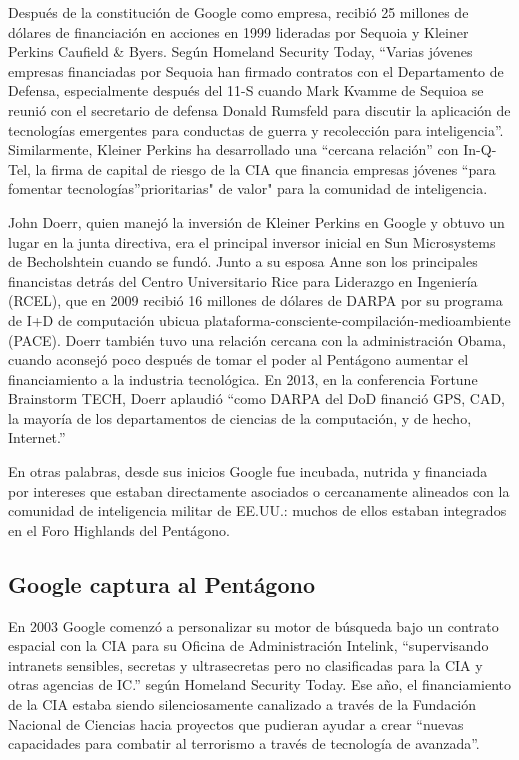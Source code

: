 \documentclass[10pt,a5paper,twoside,spanish,]{book}
\begin{document}
Después de la constitución de Google como empresa, recibió 25 millones
de dólares de financiación en acciones en 1999 lideradas por Sequoia y
Kleiner Perkins Caufield \& Byers. Según Homeland Security Today,
``Varias jóvenes empresas financiadas por Sequoia han firmado contratos
con el Departamento de Defensa, especialmente después del 11-S cuando
Mark Kvamme de Sequioa se reunió con el secretario de defensa Donald
Rumsfeld para discutir la aplicación de tecnologías emergentes para
conductas de guerra y recolección para inteligencia''. Similarmente,
Kleiner Perkins ha desarrollado una ``cercana relación'' con In-Q-Tel,
la firma de capital de riesgo de la CIA que financia empresas jóvenes
``para fomentar tecnologías''prioritarias" de valor" para la comunidad
de inteligencia.

John Doerr, quien manejó la inversión de Kleiner Perkins en Google y
obtuvo un lugar en la junta directiva, era el principal inversor inicial
en Sun Microsystems de Becholshtein cuando se fundó. Junto a su esposa
Anne son los principales financistas detrás del Centro Universitario
Rice para Liderazgo en Ingeniería (RCEL), que en 2009 recibió 16
millones de dólares de DARPA por su programa de I+D de computación
ubicua plataforma-consciente-compilación-medioambiente (PACE). Doerr
también tuvo una relación cercana con la administración Obama, cuando
aconsejó poco después de tomar el poder al Pentágono aumentar el
financiamiento a la industria tecnológica. En 2013, en la conferencia
Fortune Brainstorm TECH, Doerr aplaudió ``como DARPA del DoD financió
GPS, CAD, la mayoría de los departamentos de ciencias de la computación,
y de hecho, Internet.''

En otras palabras, desde sus inicios Google fue incubada, nutrida y
financiada por intereses que estaban directamente asociados o
cercanamente alineados con la comunidad de inteligencia militar de
EE.UU.: muchos de ellos estaban integrados en el Foro Highlands del
Pentágono.

\subsection{Google captura al
Pentágono}\label{google-captura-al-pentuxe1gono}

En 2003 Google comenzó a personalizar su motor de búsqueda bajo un
contrato espacial con la CIA para su Oficina de Administración Intelink,
``supervisando intranets sensibles, secretas y ultrasecretas pero no
clasificadas para la CIA y otras agencias de IC.'' según Homeland
Security Today. Ese año, el financiamiento de la CIA estaba siendo
silenciosamente canalizado a través de la Fundación Nacional de Ciencias
hacia proyectos que pudieran ayudar a crear ``nuevas capacidades para
combatir al terrorismo a través de tecnología de avanzada''.
\end{document}
